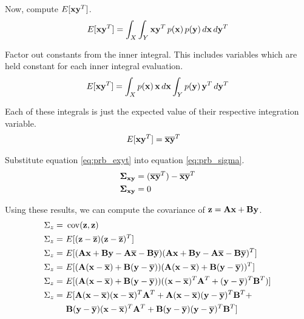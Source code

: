 Now, compute $E[\mathbf{x}\mathbf{y}^T]$.
\begin{equation*}
  E[\mathbf{x}\mathbf{y}^T] = \int_X \int_Y \mathbf{x}\mathbf{y}^T \,p(\mathbf{x})
    \,p(\mathbf{y}) \,d\mathbf{x} \,d\mathbf{y}^T
\end{equation*}

Factor out constants from the inner integral. This includes variables which are
held constant for each inner integral evaluation.
\begin{equation*}
  E[\mathbf{x}\mathbf{y}^T] = \int_X p(\mathbf{x}) \,\mathbf{x} \,d\mathbf{x}
    \int_Y p(\mathbf{y}) \,\mathbf{y}^T \,d\mathbf{y}^T
\end{equation*}

Each of these integrals is just the expected value of their respective
integration variable.
\begin{align}
  E[\mathbf{x}\mathbf{y}^T] &= \overline{\mathbf{x}}\overline{\mathbf{y}}^T \label{eq:prb_exyt}
\end{align}

Substitute equation \eqref{eq:prb_exyt} into equation \eqref{eq:prb_sigma}.
\begin{align*}
  \mathbf{\Sigma}_{\mathbf{x}\mathbf{y}} &= (\overline{\mathbf{x}}\overline{\mathbf{y}}^T) -
    \overline{\mathbf{x}}\overline{\mathbf{y}}^T \\
  \mathbf{\Sigma}_{\mathbf{x}\mathbf{y}} &= 0
\end{align*}

Using these results, we can compute the covariance of
$\mathbf{z} = \mathbf{A}\mathbf{x} + \mathbf{B}\mathbf{y}$.
\begin{align*}
  \Sigma_z =~& \operatorname{cov}(\mathbf{z}, \mathbf{z}) \\
  \Sigma_z =~& E[(\mathbf{z} - \overline{\mathbf{z}})(\mathbf{z} - \overline{\mathbf{z}})^T] \\
  \Sigma_z =~& E[(\mathbf{A}\mathbf{x} + \mathbf{B}\mathbf{y} - \mathbf{A}\overline{\mathbf{x}} -
    \mathbf{B}\overline{\mathbf{y}})(\mathbf{A}\mathbf{x} + \mathbf{B}\mathbf{y} -
    \mathbf{A}\overline{\mathbf{x}} - \mathbf{B}\overline{\mathbf{y}})^T] \\
  \Sigma_z =~& E[(\mathbf{A}(\mathbf{x} - \overline{\mathbf{x}}) +
    \mathbf{B}(\mathbf{y} - \overline{\mathbf{y}}))
    (\mathbf{A}(\mathbf{x} - \overline{\mathbf{x}}) +
     \mathbf{B}(\mathbf{y} - \overline{\mathbf{y}}))^T] \\
  \Sigma_z =~& E[(\mathbf{A}(\mathbf{x} - \overline{\mathbf{x}}) +
    \mathbf{B}(\mathbf{y} - \overline{\mathbf{y}}))
    ((\mathbf{x} - \overline{\mathbf{x}})^T\mathbf{A}^T +
     (\mathbf{y} - \overline{\mathbf{y}})^T\mathbf{B}^T)] \\
  \Sigma_z =~& E[
    \mathbf{A}(\mathbf{x} - \overline{\mathbf{x}})(\mathbf{x} - \overline{\mathbf{x}})^T\mathbf{A}^T +
    \mathbf{A}(\mathbf{x} - \overline{\mathbf{x}})(\mathbf{y} - \overline{\mathbf{y}})^T\mathbf{B}^T + \\
    &\mathbf{B}(\mathbf{y} - \overline{\mathbf{y}})(\mathbf{x} - \overline{\mathbf{x}})^T\mathbf{A}^T +
    \mathbf{B}(\mathbf{y} - \overline{\mathbf{y}})(\mathbf{y} - \overline{\mathbf{y}})^T\mathbf{B}^T]
\end{align*}

